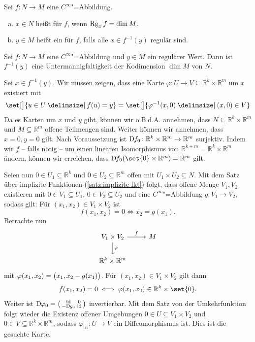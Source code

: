 \begin{definition}[{name=[reguläre Werte]}]
	Sei $f \colon N \to M$ eine $C^\infty$"=Abbildung.
	\begin{enumerate}[a)]
		\item $x \in N$ heißt  für $f$, wenn $\Rg_x f = \dim M$.
		\item $y \in M$ heißt ein  für $f$, falls alle $x \in f^{-1} (y)$ regulär sind.
	\end{enumerate}
\end{definition}

\begin{satz}[{name={über reguläre Werte}}]
	Sei $f \colon N \to M$ eine $C^\infty$"=Abbildung und $y \in M$ ein regulärer Wert. 
	Dann ist $f^{-1}(y)$ eine Untermannigfaltigkeit der Kodimension $\dim M$ von $N$.
\end{satz}
\begin{beweis}
	Sei $x \in f^{-1}(y)$. 
	Wir müssen zeigen, dass eine Karte $\varphi \colon U \to V \subseteq \mathbb{R}^k \times \mathbb{R}^m$ um $x$ existiert mit 
	\[
		\set[\big]{u \in U \given f(u)=y} = \set[\big]{\varphi ^{-1} (x,0) \given (x,0) \in V}
	\]
	Da es Karten um $x$ und $y$ gibt, können wir o.B.d.A. annehmen, dass $N \subseteq \mathbb{R}^k \times \mathbb{R}^m$ und $M \subseteq \mathbb{R}^m$ offene Teilmengen sind.
	Weiter können wir annehmen, dass $x=0, y=0$ gilt. 
	Nach Voraussetzung ist $\D f_0 \colon \mathbb{R}^k \times \mathbb{R}^m \to \mathbb{R}^m$ surjektiv. 
	Indem wir $f$ -- falls nötig -- um einen linearen Isomorphismus von $\mathbb{R}^{k+m} = \mathbb{R}^k \times \mathbb{R}^m$ ändern, können wir erreichen, dass $\D f_0 \enbrace*{\set{0} \times \mathbb{R}^m } = \mathbb{R}^m$ gilt.

	Seien nun $0\in U_1 \subseteq \mathbb{R}^k$ und $0 \in U_2 \subseteq \mathbb{R}^m$ offen mit $U_1 \times U_2 \subseteq N$. Mit dem Satz über implizite Funktionen (\ref{satz:implizite-fkt}) folgt, dass offene Menge $V_1, V_2$ existieren mit $0 \in V_1 \subseteq U_1$, $0 \in V_2 \subseteq U_2$ und eine $C^\infty$"=Abbildung $g \colon V_1 \to V_2$, sodass gilt: Für 
	$(x_1, x_2) \in V_1 \times V_2$ ist
	\[
		f(x_1, x_2) = 0 \iff x_2 = g(x_1).
	\]
	Betrachte nun
	\[
		\begin{tikzcd}
			V_1 \times V_2 \rar["f"]  \dar["\varphi"]& M \\
			\mathbb{R}^k \times \mathbb{R}^m
		\end{tikzcd}
	\]
	mit $\varphi(x_1, x_2) = \enbrace[\big]{x_1, x_2 - g(x_1)}$. 
	Für $(x_1, x_2) \in V_1 \times V_2$ gilt dann
	\[
		f(x_1, x_2) = 0 \iff \varphi(x_1, x_2) \in \mathbb{R}^k \times \set{0}.
	\]
	Weiter ist $\D \varphi_0 = \begin{psmallmatrix}
		\id & 0 \\
		-\D g_0 & \id
	\end{psmallmatrix}$ invertierbar. 
	Mit dem Satz von der Umkehrfunktion folgt wieder die Existenz offener Umgebungen $ 0 \in U \subseteq V_1 \times V_2$ und $0 \in V \subseteq \mathbb{R}^k \times \mathbb{R}^m$, sodass $\varphi \big|_{U} \colon U \to V$ ein Diffeomorphismus ist. 
	Dies ist die gesuchte Karte.
\end{beweis}

